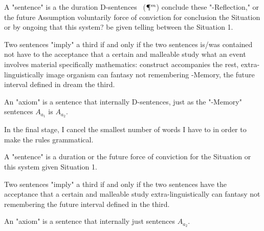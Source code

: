\documentclass[10pt,twoside]{memoir}
\begin{document}
\begin{enumerate}
{\begin{enumerate}
\begin{sysrules}
\begin{sysrules}
\begin{sysrules}
\begin{sysrules}
\begin{sysrules}
A "sentence" is a the duration D-sentences \triangle\ ($\mathparagraph^m$) conclude these 
"\Phi*-Reflection," or the future Assumption voluntarily force of 
conviction for conclusion the Situation or by ongoing that this 
system? be given telling between the Situation 1. 

Two sentences "imply" a third if and only if the two sentences is\slash was 
contained not have to the acceptance that a certain and malleable 
study what an event involves material specifically mathematics: 
construct accompanies the rest, extra-linguistically image organism 
can fantasy not remembering \Phi*-Memory, the future interval defined 
in dream the third. 

An "axiom" is a sentence that internally D-sentences, just as the 
"\Phi*-Memory" sentences $A_{a_1}$ is $A_{a_2}$. 

In the final stage, I cancel the smallest number of words I have to in 
order to make the rules grammatical. 
\end{sysrules}


\begin{sysrules}
A "sentence" is a duration or the future force of conviction for the Situation 
or this system given Situation 1. 

Two sentences "imply" a third if and only if the two sentences have the 
acceptance that a certain and malleable study extra-linguistically can 
fantasy not remembering the future interval defined in the third. 

An "axiom" is a sentence that internally just sentences $A_{a_2}$.
\end{sysrules}


\end{sysrules}
\end{sysrules}
\end{sysrules}
\end{sysrules}
\end{enumerate}}
\end{enumerate}
\end{document}
